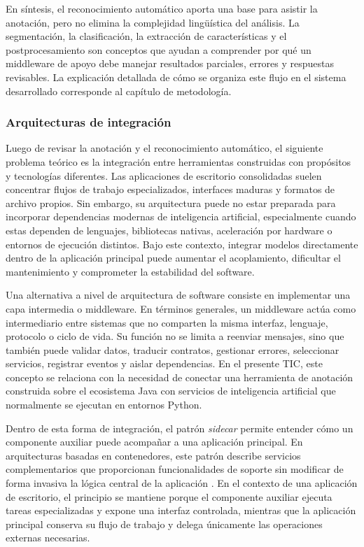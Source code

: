 En síntesis, el reconocimiento automático aporta una base para asistir la anotación, pero no elimina la complejidad lingüística del análisis. La segmentación, la clasificación, la extracción de características y el postprocesamiento son conceptos que ayudan a comprender por qué un middleware de apoyo debe manejar resultados parciales, errores y respuestas revisables. La explicación detallada de cómo se organiza este flujo en el sistema desarrollado corresponde al capítulo de metodología.


\subsubsection{Arquitecturas de integración}

Luego de revisar la anotación y el reconocimiento automático, el siguiente problema teórico es la integración entre herramientas construidas con propósitos y tecnologías diferentes. Las aplicaciones de escritorio consolidadas suelen concentrar flujos de trabajo especializados, interfaces maduras y formatos de archivo propios. Sin embargo, su arquitectura puede no estar preparada para incorporar dependencias modernas de inteligencia artificial, especialmente cuando estas dependen de lenguajes, bibliotecas nativas, aceleración por hardware o entornos de ejecución distintos. Bajo este contexto, integrar modelos directamente dentro de la aplicación principal puede aumentar el acoplamiento, dificultar el mantenimiento y comprometer la estabilidad del software.

Una alternativa a nivel de arquitectura de software consiste en implementar una capa intermedia o middleware. En términos generales, un middleware actúa como intermediario entre sistemas que no comparten la misma interfaz, lenguaje, protocolo o ciclo de vida. Su función no se limita a reenviar mensajes, sino que también puede validar datos, traducir contratos, gestionar errores, seleccionar servicios, registrar eventos y aislar dependencias. En el presente TIC, este concepto se relaciona con la necesidad de conectar una herramienta de anotación construida sobre el ecosistema Java con servicios de inteligencia artificial que normalmente se ejecutan en entornos Python.

Dentro de esta forma de integración, el patrón \textit{sidecar} permite entender cómo un componente auxiliar puede acompañar a una aplicación principal. En arquitecturas basadas en contenedores, este patrón describe servicios complementarios que proporcionan funcionalidades de soporte sin modificar de forma invasiva la lógica central de la aplicación \cite{burns2016container_patterns}. En el contexto de una aplicación de escritorio, el principio se mantiene porque el componente auxiliar ejecuta tareas especializadas y expone una interfaz controlada, mientras que la aplicación principal conserva su flujo de trabajo y delega únicamente las operaciones externas necesarias.

